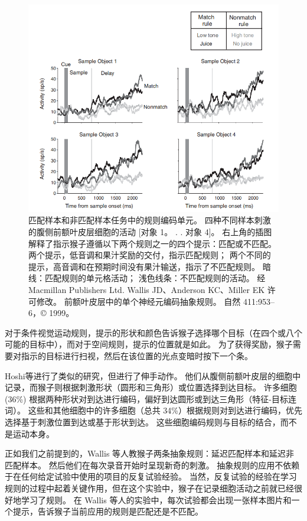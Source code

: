 \begin{figure}
	\centering
	\includegraphics[width=0.6\linewidth]{image_pfc/Fig_7_9}
	\caption{匹配样本和非匹配样本任务中的规则编码单元。
		四种不同样本刺激的腹侧前额叶皮层细胞的活动 [对象 1。 . . 对象 4]。 
		右上角的插图解释了指示猴子遵循以下两个规则之一的四个提示：匹配或不匹配。
		两个提示，低音调和果汁奖励的交付，指示匹配规则；
		两个不同的提示，高音调和在预期时间没有果汁输送，指示了不匹配规则。 
		暗线：匹配规则的单元格活动； 浅色线条：不匹配规则的活动。 
		经 Macmillan Publishers Ltd. Wallis JD、Anderson KC、Miller EK 许可修改。 
		前额叶皮层中的单个神经元编码抽象规则。 自然 411:953–6，© 1999。\label{fig:7_9}}
\end{figure}
\par


对于条件视觉运动规则，提示的形状和颜色告诉猴子选择哪个目标（在四个或八个可能的目标中），而对于空间规则，提示的位置就是如此。 
为了获得奖励，猴子需要对指示的目标进行扫视，然后在该位置的光点变暗时按下一个条。
\par


Hoshi等\cite{hoshi1998task}进行了类似的研究，但进行了伸手动作。 
他们从腹侧前额叶皮层的细胞中记录，而猴子则根据刺激形状（圆形和三角形）或位置选择到达目标。
许多细胞 (36\%) 根据两种形状对到达进行编码，偏好到达圆形或到达三角形（特征-目标连词）。
这些和其他细胞中的许多细胞（总共 34\%）根据规则对到达进行编码，优先选择基于刺激位置到达或基于形状到达。 
这些细胞编码规则与目标的结合，而不是运动本身。
\par


正如我们之前提到的，Wallis 等人\cite{wallis2001single}教猴子两条抽象规则：延迟匹配样本和延迟非匹配样本。 
然后他们在每次录音开始时呈现新奇的刺激。 抽象规则的应用不依赖于在任何给定试验中使用的项目的反复试验经验。 
当然，反复试验的经验在学习规则的过程中起着关键作用，但在这个实验中，猴子在记录细胞活动之前就已经很好地学习了规则。 
在 Wallis 等人的实验中，每次试验都会出现一张样本图片和一个提示，告诉猴子当前应用的规则是匹配还是不匹配。
\par


